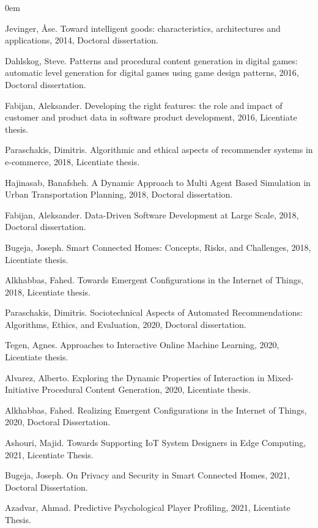 \documentclass[hidelinks,green,onecolumn,twoside]{dissertation}
\begin{document}
\begin{otherTheses}
\itemsep0em 
    \item Jevinger, Åse. Toward intelligent goods: characteristics, architectures and applications, 2014, Doctoral dissertation.
    \item Dahlskog, Steve. Patterns and procedural content generation in digital games: automatic level generation for digital games using game design patterns, 2016, Doctoral dissertation.
    \item Fabijan, Aleksander. Developing the right features: the role and impact of customer and product data in software product development, 2016, Licentiate thesis.
    \item Paraschakis, Dimitris. Algorithmic and ethical aspects of recommender systems in e-commerce, 2018, Licentiate thesis.
    \item \sloppy Hajinasab, Banafsheh. A Dynamic Approach to Multi Agent Based Simulation in Urban Transportation Planning, 2018, Doctoral dissertation.
    \item Fabijan, Aleksander. Data-Driven Software Development at Large Scale, 2018, Doctoral dissertation.
    \item Bugeja, Joseph. Smart Connected Homes: Concepts, Risks, and Challenges, 2018, Licentiate thesis.
    \item Alkhabbas, Fahed. Towards Emergent Configurations in the Internet of Things, 2018, Licentiate thesis.
    \item Paraschakis, Dimitris. Sociotechnical Aspects of Automated Recommendations: Algorithms, Ethics, and Evaluation, 2020, Doctoral dissertation.
    \item Tegen, Agnes. Approaches to Interactive Online Machine Learning, 2020, Licentiate thesis.
    \item Alvarez, Alberto. Exploring the Dynamic Properties of Interaction in Mixed-Initiative Procedural Content Generation, 2020, Licentiate thesis.
    \item Alkhabbas, Fahed. Realizing Emergent Configurations in the Internet of Things, 2020, Doctoral Dissertation.
    \item Ashouri, Majid. Towards Supporting IoT System Designers in Edge Computing, 2021, Licentiate Thesis.
    \item Bugeja, Joseph. On Privacy and Security in Smart Connected Homes, 2021, Doctoral Dissertation.
    \item Azadvar, Ahmad. Predictive Psychological Player Profiling, 2021, Licentiate Thesis.

\end{otherTheses}
\end{document}
